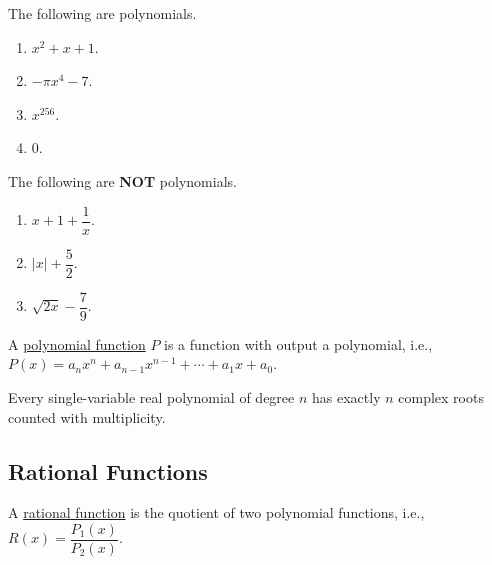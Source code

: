 \documentclass[11pt]{book}
\begin{document}
\begin{example}
    The following are polynomials.
    \vspace{-1em}
    \begin{multicols}{4}
        \begin{enumerate}
            \item $x^2+x+1$.
            \item $-\pi x^4-7$.
            \item $x^{256}$.
            \item $0$.
        \end{enumerate}
    \end{multicols}
    \vspace{0.1em}
\end{example}

\begin{example}
    The following are \textbf{NOT} polynomials.
    \vspace{-1em}
    \begin{multicols}{3}
        \begin{enumerate}
            \item $x+1+\dfrac{1}{x}$.
            \item $|x|+\dfrac{5}{2}$.
            \item $\sqrt{2x}-\dfrac{7}{9}$.
        \end{enumerate}
    \end{multicols}
    \vspace{0.1em}
\end{example}

\begin{definition}
    A \underline{polynomial function} $P$ is a function with output a polynomial, i.e., $P(x)=a_nx^n+a_{n-1}x^{n-1}+\cdots+a_1x+a_0$.
\end{definition}

\begin{theorem}
    Every single-variable real polynomial of degree $n$ has exactly $n$ complex roots counted with multiplicity.
\end{theorem}

\subsection*{Rational Functions}

\begin{definition}
    A \underline{rational function} is the quotient of two polynomial functions, i.e., $R(x)=\dfrac{P_1(x)}{P_2(x)}$.
\end{definition}
\end{document}
